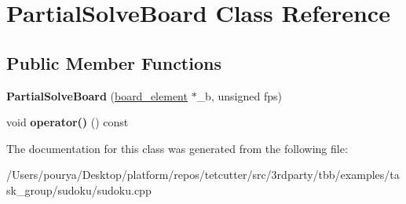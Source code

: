 \hypertarget{classPartialSolveBoard}{}\section{Partial\+Solve\+Board Class Reference}
\label{classPartialSolveBoard}
\subsection*{Public Member Functions}
\begin{DoxyCompactItemize}
\item 
\hypertarget{classPartialSolveBoard_a46f9a843c35de68a4bf2afafec245cde}{}{\bfseries Partial\+Solve\+Board} (\hyperlink{structboard__element}{board\+\_\+element} $\ast$\+\_\+b, unsigned fps)\label{classPartialSolveBoard_a46f9a843c35de68a4bf2afafec245cde}

\item 
\hypertarget{classPartialSolveBoard_aaa52d6b70c517ae895b848d11286bdee}{}void {\bfseries operator()} () const \label{classPartialSolveBoard_aaa52d6b70c517ae895b848d11286bdee}

\end{DoxyCompactItemize}


The documentation for this class was generated from the following file\+:\begin{DoxyCompactItemize}
\item 
/\+Users/pourya/\+Desktop/platform/repos/tetcutter/src/3rdparty/tbb/examples/task\+\_\+group/sudoku/sudoku.\+cpp\end{DoxyCompactItemize}
